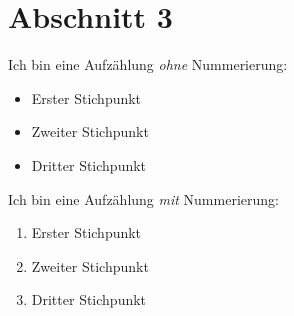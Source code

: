 

\section{Abschnitt 3}\label{sec:abschnitt_3}

Ich bin eine Aufzählung \textit{ohne} Nummerierung:

\begin{itemize}
    \item Erster Stichpunkt
    \item Zweiter Stichpunkt
    \item Dritter Stichpunkt
\end{itemize}

\noindent Ich bin eine Aufzählung \textit{mit} Nummerierung:

\begin{enumerate}
    \item Erster Stichpunkt
    \item Zweiter Stichpunkt
    \item Dritter Stichpunkt
\end{enumerate}
